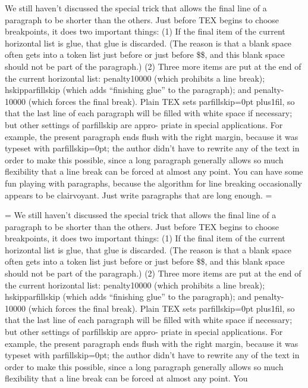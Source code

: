 \hangindent=-40pt  We still haven’t discussed the special trick that allows the final line of a paragraph 
to be shorter than the others. Just before TEX begins to choose breakpoints, 
it does two important things: (1) If the final item of the current horizontal
list is glue, that glue is discarded. (The reason is that a blank space often gets into a
token list just before or just before \$\$, and this blank space should not be part
of the paragraph.) (2) Three more items are put at the end of the current horizontal
list: penalty10000 (which prohibits a line break); hskipparfillskip (which adds
“finishing glue” to the paragraph); and penalty-10000 (which forces the final break).
Plain TEX sets parfillskip=0pt plus1fil, so that the last line of each paragraph will
be filled with white space if necessary; but other settings of parfillskip are appro-
priate in special applications. For example, the present paragraph ends flush with the
right margin, because it was typeset with parfillskip=0pt; the author didn’t have to
rewrite any of the text in order to make this possible, since a long paragraph generally
allows so much flexibility that a line break can be forced at almost any point. You
can have some fun playing with paragraphs, because the algorithm for line breaking
occasionally appears to be clairvoyant. Just write paragraphs that are long enough.
=\hangafter
\par
\hangindent=-40pt \hangafter=
We still haven’t discussed the special trick that allows the final line of a paragraph 
to be shorter than the others. Just before TEX begins to choose breakpoints, 
it does two important things: (1) If the final item of the current horizontal
list is glue, that glue is discarded. (The reason is that a blank space often gets into a
token list just before or just before \$\$, and this blank space should not be part
of the paragraph.) (2) Three more items are put at the end of the current horizontal
list: penalty10000 (which prohibits a line break); hskipparfillskip (which adds
“finishing glue” to the paragraph); and penalty-10000 (which forces the final break).
Plain TEX sets parfillskip=0pt plus1fil, so that the last line of each paragraph will
be filled with white space if necessary; but other settings of parfillskip are appro-
priate in special applications. For example, the present paragraph ends flush with the
right margin, because it was typeset with parfillskip=0pt; the author didn’t have to
rewrite any of the text in order to make this possible, since a long paragraph generally
allows so much flexibility that a line break can be forced at almost any point. You
